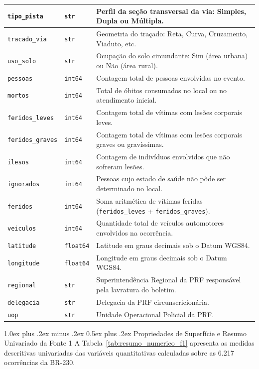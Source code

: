 \documentclass[11pt,a4paper]{article}
\makeatletter
\renewcommand\subsubsection{
\@startsection{subsubsection}{3}{0pt}%
{1.0ex plus .2ex minus .2ex}%
{0.5ex plus .2ex}%
{\normalfont\normalsize\bfseries}
}
\makeatother
\begin{document}
\begin{table}[H]
\begin{tabularx}{\textwidth}{|p{3.2cm}|p{1.4cm}|X|}
\hline
\texttt{tipo\_pista} & \texttt{str} & Perfil da seção transversal da via: Simples, Dupla ou Múltipla. \\
\hline
\texttt{tracado\_via} & \texttt{str} & Geometria do traçado: Reta, Curva, Cruzamento, Viaduto, etc. \\
\hline
\texttt{uso\_solo} & \texttt{str} & Ocupação do solo circundante: Sim (área urbana) ou Não (área rural). \\
\hline
\texttt{pessoas} & \texttt{int64} & Contagem total de pessoas envolvidas no evento. \\
\hline
\texttt{mortos} & \texttt{int64} & Total de óbitos consumados no local ou no atendimento inicial. \\
\hline
\texttt{feridos\_leves} & \texttt{int64} & Contagem total de vítimas com lesões corporais leves. \\
\hline
\texttt{feridos\_graves} & \texttt{int64} & Contagem total de vítimas com lesões corporais graves ou gravíssimas. \\
\hline
\texttt{ilesos} & \texttt{int64} & Contagem de indivíduos envolvidos que não sofreram lesões. \\
\hline
\texttt{ignorados} & \texttt{int64} & Pessoas cujo estado de saúde não pôde ser determinado no local. \\
\hline
\texttt{feridos} & \texttt{int64} & Soma aritmética de vítimas feridas (\texttt{feridos\_leves} + \texttt{feridos\_graves}). \\
\hline
\texttt{veiculos} & \texttt{int64} & Quantidade total de veículos automotores envolvidos na ocorrência. \\
\hline
\texttt{latitude} & \texttt{float64} & Latitude em graus decimais sob o Datum WGS84. \\
\hline
\texttt{longitude} & \texttt{float64} & Longitude em graus decimais sob o Datum WGS84. \\
\hline
\texttt{regional} & \texttt{str} & Superintendência Regional da PRF responsável pela lavratura do boletim. \\
\hline
\texttt{delegacia} & \texttt{str} & Delegacia da PRF circunscricionária. \\
\hline
\texttt{uop} & \texttt{str} & Unidade Operacional Policial da PRF. \\
\hline
\end{tabularx}
\end{table}

\subsubsection{Propriedades de Superfície e Resumo Univariado da Fonte 1}
A Tabela~\ref{tab:resumo_numerico_f1} apresenta as medidas descritivas univariadas das variáveis quantitativas calculadas sobre as 6.217 ocorrências da BR-230.
\end{document}
